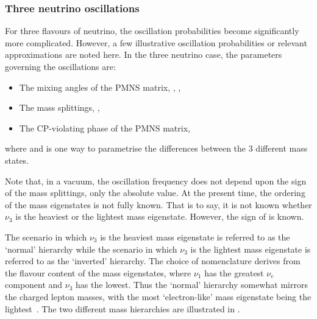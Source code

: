 \subsubsection{Three neutrino oscillations}
\label{sec:theory:theory:threeNeutrino}

For three flavours of neutrino, the oscillation probabilities become significantly more complicated.
However, a few illustrative oscillation probabilities or relevant approximations are noted here.
In the three neutrino case, the parameters governing the oscillations are:
\begin{itemize}
\item The mixing angles of the PMNS matrix, , , 
\item The mass splittings, , 
\item The CP-violating phase of the PMNS matrix, \dcp
\end{itemize}
where  and  is one way to parametrise the differences between the 3 different mass states.

Note that, in a vacuum, the oscillation frequency does not depend upon the sign of the mass splittings, only the absolute value.
At the present time, the ordering of the mass eigenstates is not fully known.
That is to say, it is not known whether $\nu_{3}$ is the heaviest or the lightest mass eigenstate.
However, the sign of  is known.

The scenario in which $\nu_{3}$ is the heaviest mass eigenstate is referred to as the `normal' hierarchy while the scenario in which $\nu_{3}$ is the lightest mass eigenstate is referred to as the `inverted' hierarchy.
The choice of nomenclature derives from the flavour content of the mass eigenstates, where $\nu_{1}$ has the greatest $\nu_{e}$ component and $\nu_{3}$ has the lowest.
Thus the `normal' hierarchy somewhat mirrors the charged lepton masses, with the most `electron-like' mass eigenstate being the lightest~\cite{massHierarchy}.
The two different mass hierarchies are illustrated in .

